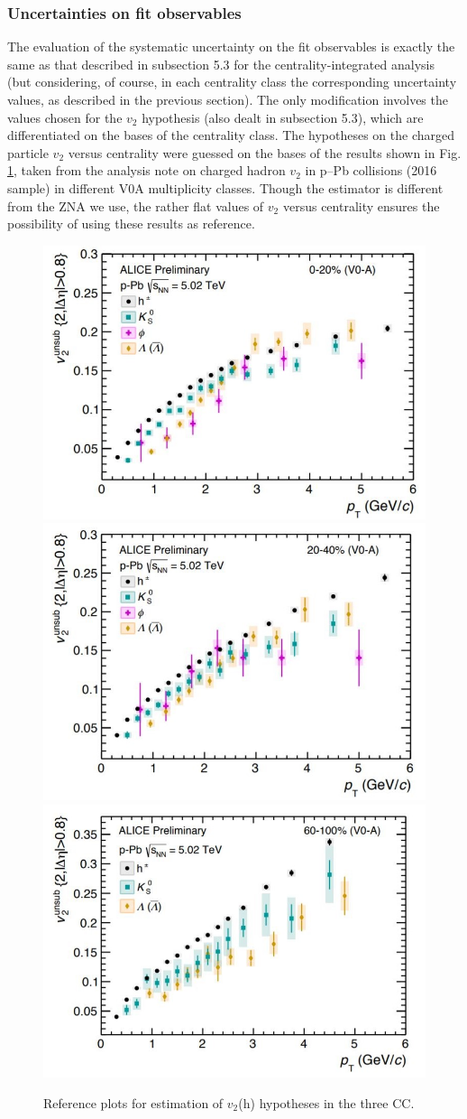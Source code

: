 \subsubsection{Uncertainties on fit observables}
The evaluation of the systematic uncertainty on the fit observables is exactly the same as that described in subsection 5.3 for the centrality-integrated analysis (but considering, of course, in each centrality class the corresponding uncertainty values, as described in the previous section).
The only modification involves the values chosen for the $v_2$ hypothesis (also dealt in subsection 5.3), which are differentiated on the bases of the centrality class.
The hypotheses on the charged particle $v_2$ versus centrality were guessed on the bases of the results shown in Fig. \ref{fig:v2h}, taken from the analysis note on charged hadron $v_2$ in p--Pb collisions (2016 sample) in different V0A multiplicity classes. Though the estimator is different from the ZNA we use, the rather flat values of $v_2$ versus centrality ensures the possibility of using these results as reference.

\begin{figure}
\centering
{\includegraphics[width=0.45\linewidth]{figuresVsCent/Global/v2/v2h1.jpg}}
{\includegraphics[width=0.45\linewidth]{figuresVsCent/Global/v2/v2h2.jpg}} \\
{\includegraphics[width=0.45\linewidth]{figuresVsCent/Global/v2/v2h3.jpg}}
 \caption{Reference plots for estimation of $v_2$(h) hypotheses in the three CC.}
\label{fig:v2h}
\end{figure}

